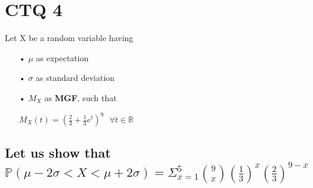 \documentclass[11pt]{article}
\def\lt{<}
\begin{document}
\newpage

\section{CTQ 4}

Let X be a random variable having 

\begin{itemize}
\item[•]$\mu$ as expectation
\item[•]$\sigma$ as standard deviation
\item[•]$M_X$ as \textbf{MGF}, such that 

$M_X(t)=(\frac{2}{3}+\frac{1}{3}e^t)^9 \textbf{ }\forall t\in \mathbb{R}$
\end{itemize}

\subsection{ Let us show that 
$\mathbb {P}(\mu -2\sigma \lt  X \lt \mu+2\sigma)=\Sigma_{x=1}^{5}\binom{9}{x}(\frac{1}{3})^x(\frac{2}{3})^{9-x}$}
\end{document}
